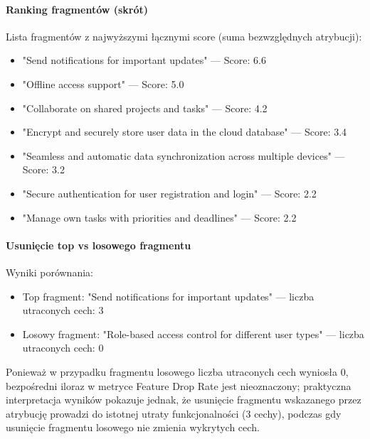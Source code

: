 \documentclass[12pt,a4paper]{article}
\begin{document}
\paragraph{Ranking fragmentów (skrót)}
Lista fragmentów z najwyższymi łącznymi score (suma bezwzględnych atrybucji):
\begin{itemize}
    \item "Send notifications for important updates" — Score: 6.6
    \item "Offline access support" — Score: 5.0
    \item "Collaborate on shared projects and tasks" — Score: 4.2
    \item "Encrypt and securely store user data in the cloud database" — Score: 3.4
    \item "Seamless and automatic data synchronization across multiple devices" — Score: 3.2
    \item "Secure authentication for user registration and login" — Score: 2.2
    \item "Manage own tasks with priorities and deadlines" — Score: 2.2
\end{itemize}

\paragraph{Usunięcie top vs losowego fragmentu}
Wyniki porównania:
\begin{itemize}
    \item Top fragment: "Send notifications for important updates" — liczba utraconych cech: 3
    \item Losowy fragment: "Role-based access control for different user types" — liczba utraconych cech: 0
\end{itemize}

Ponieważ w przypadku fragmentu losowego liczba utraconych cech wyniosła 0, bezpośredni iloraz w metryce Feature Drop Rate jest nieoznaczony; praktyczna interpretacja wyników pokazuje jednak, że usunięcie fragmentu wskazanego przez atrybucję prowadzi do istotnej utraty funkcjonalności (3 cechy), podczas gdy usunięcie fragmentu losowego nie zmienia wykrytych cech.
\end{document}
